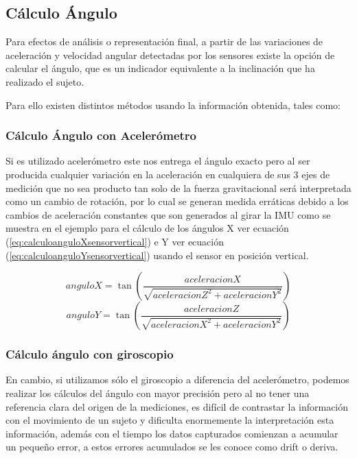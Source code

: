 \documentclass[12pt,a4paper]{article}
\begin{document}
			\subsection{Cálculo Ángulo} Para efectos de análisis o representación final, a partir de las variaciones de aceleración y velocidad angular detectadas por los sensores existe la opción de calcular el ángulo, que es un indicador equivalente a la inclinación que ha realizado el sujeto.
			
			Para ello existen distintos métodos usando la información obtenida, tales como:
			
			
			\subsubsection{Cálculo Ángulo con Acelerómetro} Si es utilizado acelerómetro este nos entrega el ángulo exacto pero al ser producida cualquier variación en la aceleración en cualquiera de sus 3 ejes de medición que no sea producto tan solo de la fuerza gravitacional será interpretada como un cambio de rotación, por lo cual se generan medida erráticas debido a los cambios de aceleración constantes que son generados al girar la IMU como se muestra en el ejemplo para el cálculo de los ángulos X ver ecuación (\ref{eq:calculoanguloXsensorvertical}) e Y ver ecuación (\ref{eq:calculoanguloYsensorvertical}) usando el sensor en posición vertical.
			
			\begin{figure}[H]
				\begin{equation}
					anguloX = \tan{\left(\frac{aceleracionX}{\sqrt{aceleracionZ^{2}+aceleracionY^{2}}}\right)}
					\label{eq:calculoanguloXsensorvertical}
				\end{equation}
				\begin{equation}
					anguloY = \tan{\left(\frac{aceleracionZ}{\sqrt{aceleracionX^{2}+aceleracionY^{2}}}\right)}
					\label{eq:calculoanguloYsensorvertical}
				\end{equation}
			\end{figure}
			
			\subsubsection{Cálculo ángulo con giroscopio} 
			En cambio, si utilizamos sólo el giroscopio a diferencia del acelerómetro, podemos realizar los cálculos del ángulo con mayor precisión pero al no tener una referencia clara del origen de la mediciones, es difícil de contrastar la información con el movimiento de un sujeto y dificulta enormemente la  interpretación esta información, además con el tiempo los datos capturados comienzan a acumular un pequeño error, a estos errores acumulados se les conoce como drift o deriva.
			
\end{document}
